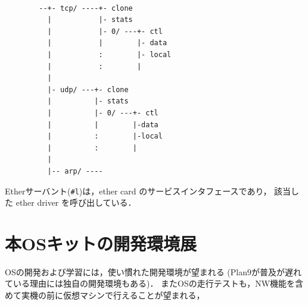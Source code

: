 \documentclass{ieicej}
\begin{document}
{\footnotesize
\begin{verbatim}

        --+- tcp/ ----+- clone                        
          |           |- stats                
          |           |- 0/ ---+- ctl          
          |           |        |- data     
          |           :        |- local    
          |           :        |           
          |                               
          |- udp/ ---+- clone                        
          |          |- stats                  
          |          |- 0/ ---+- ctl            
          |          |        |-data     
          |          :        |-local    
          |          :        |           
          |                                              
          |-- arp/ ----
\end{verbatim}
}

Etherサーバント(\verb|#l|)は，ether card のサービスインタフェースであり，
該当した ether driver を呼び出している．

\section{本OSキットの開発環境展}

OSの開発および学習には，使い慣れた開発環境が望まれる
(Plan9が普及が遅れている理由には独自の開発環境もある)．
またOSの走行テストも，NW機能を含めて実機の前に仮想マシンで行えることが望まれる，
\end{document}
